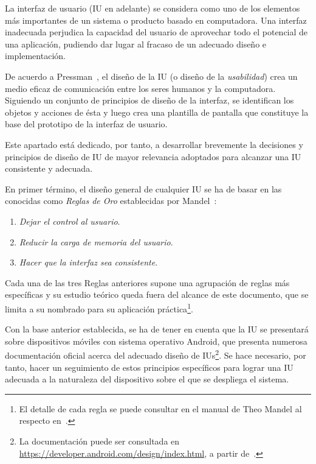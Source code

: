 La interfaz de usuario (IU en adelante) se considera como uno de los elementos más importantes de un sistema o producto basado en computadora. Una interfaz inadecuada perjudica la capacidad del usuario de aprovechar todo el potencial de una aplicación, pudiendo dar lugar al fracaso de un adecuado diseño e implementación.

De acuerdo a Pressman~\cite{Pre10}, el diseño de la IU (o diseño de la \emph{usabilidad}) crea un medio eficaz de comunicación entre los seres humanos y la computadora. Siguiendo un conjunto de principios de diseño de la interfaz, se identifican los objetos y acciones de ésta y luego crea una plantilla de pantalla que constituye la base del prototipo de la interfaz de usuario.

Este apartado está dedicado, por tanto, a desarrollar brevemente la decisiones y principios de diseño de IU de mayor relevancia adoptados para alcanzar una IU consistente y adecuada.

En primer término, el diseño general de cualquier IU se ha de basar en las conocidas como \emph{Reglas de Oro} establecidas por Mandel~\cite{Man97}:

\begin{enumerate}
	\item{\textit{Dejar el control al usuario}}.
	\item{\textit{Reducir la carga de memoria del usuario}}.
	\item{\textit{Hacer que la interfaz sea consistente}}.
\end{enumerate}

Cada una de las tres Reglas anteriores supone una agrupación de reglas más específicas y su estudio teórico queda fuera del alcance de este documento, que se limita a su nombrado para su aplicación práctica\footnote{El detalle de cada regla se puede consultar en el manual de Theo Mandel al respecto en~\cite{Man97}.}.

Con la base anterior establecida, se ha de tener en cuenta que la IU se presentará sobre dispositivos móviles con sistema operativo Android, que presenta numerosa documentación oficial acerca del adecuado diseño de IUs\footnote{La documentación puede ser consultada en \url{https://developer.android.com/design/index.html}, a partir de~\cite{AnDev}.}. Se hace necesario, por tanto, hacer un seguimiento de estos principios específicos para lograr una IU adecuada a la naturaleza del dispositivo sobre el que se despliega el sistema.

